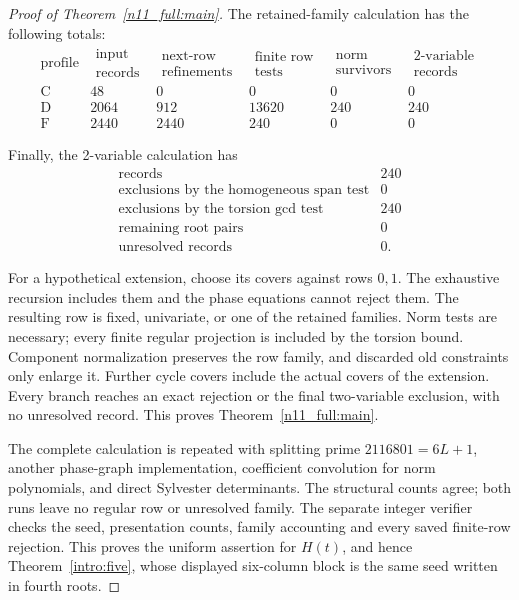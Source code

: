 \documentclass[11pt,a4paper]{article}
\theoremstyle{plain}
\theoremstyle{definition}
\theoremstyle{plain}
\begin{document}
\begin{proof}[Proof of Theorem~\ref{n11_full:main}]
The retained-family calculation has the following totals:
$$\begin{array}{c|r|r|r|r|r}
\text{profile}&\begin{gathered}\text{input}\\\text{records}\end{gathered}&\begin{gathered}\text{next-row}\\\text{refinements}\end{gathered}&
\begin{gathered}\text{finite row}\\\text{tests}\end{gathered}&\begin{gathered}\text{norm}\\\text{survivors}\end{gathered}&\begin{gathered}\text{2-variable}\\\text{records}\end{gathered}\\\hline
\mathrm{C}&48&0&0&0&0\\
\mathrm{D}&2064&912&13620&240&240\\
\mathrm{F}&2440&2440&240&0&0
\end{array}$$

Finally, the 2-variable calculation has
$$\begin{array}{l|r}
\text{records}&240\\
\text{exclusions by the homogeneous span test}&0\\
\text{exclusions by the torsion gcd test}&240\\
\text{remaining root pairs}&0\\
\text{unresolved records}&0.
\end{array}$$

For a hypothetical extension, choose its covers against rows $0,1$. The exhaustive recursion includes them and the phase equations cannot reject them. The resulting row is fixed, univariate, or one of the retained families. Norm tests are necessary; every finite regular projection is included by the torsion bound. Component normalization preserves the row family, and discarded old constraints only enlarge it. Further cycle covers include the actual covers of the extension. Every branch reaches an exact rejection or the final two-variable exclusion, with no unresolved record. This proves Theorem~\ref{n11_full:main}.

The complete calculation is repeated with splitting prime $2116801=6L+1$, another phase-graph implementation, coefficient convolution for norm polynomials, and direct Sylvester determinants. The structural counts agree; both runs leave no regular row or unresolved family. The separate integer verifier checks the seed, presentation counts, family accounting and every saved finite-row rejection. This proves the uniform assertion for $H(t)$, and hence Theorem~\ref{intro:five}, whose displayed six-column block is the same seed written in fourth roots.
\end{proof}
\end{document}

